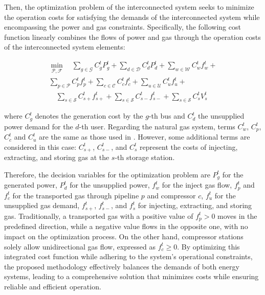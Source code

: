 Then, the optimization problem of the interconnected system seeks to minimize the operation costs for satisfying the demands of the interconnected system while encompassing the power and gas constraints. Specifically, the following cost function linearly combines the flows of power and gas through the operation costs of the interconnected system elements:

\begin{equation} \label{eq:obj_func_integrated}
\begin{split}
\min_{\mathcal{P}, \mathcal{F}} \quad  \sum_{g \in \mathcal{G}} C_{g}^t {P_{g}^t} + \sum_{d \in \mathcal{D}} C_{d}^t {P_{d}^t} +  \sum_{w \in \mathcal{W}} C_{w}^t {f_{w}^t} + \\ \sum_{p \in \mathcal{P}} C_{p}^t {f_{p}^t}  + \sum_{c \in \mathcal{C}} C_{c}^t {f_{c}^t} + \sum_{u \in \mathcal{U}} C_{u}^{t} {f_{u}^{t}} + \\ \quad \sum_{s \in \mathcal{S}} C_{s+}^{t} {f_{s+}^{t}}  + \sum_{s \in \mathcal{S}} C_{s-}^{t} {f_{s-}^{t}} + \sum_{s \in \mathcal{S}} C_{s}^{t} {V_{s}^{t}}
\end{split}
\end{equation}

where $C_g^t$ denotes the generation cost by the $g$-th bus and $C_d^t$ the unsupplied power demand for the $d$-th user. Regarding the natural gas system, terms $C_w^t$, $C_p^t$, $C_c^t$ and $C_u^t$ are the same as those used in . However, some additional terms are considered in this case: $C_{s+}^t$, $C_{s-}^t$, and $C_{s}^t$ represent the costs of injecting, extracting, and storing gas at the $s$-th storage station.





Therefore, the decision variables for the optimization problem are $P_g^t$ for the generated power, $P_d^t$ for the unsupplied power, $f_w^t$ for the inject gas flow, $f_p^t$ and $f_c^t$ for the transported gas through pipeline $p$ and compressor $c$, $f_u^t$ for the unsupplied gas demand, $f_{s+}^t$, $f_{s-}^t$, and $f_{s}^t$ for injecting, extracting, and storing gas. Traditionally, a transported gas with a positive value of $ f_ { p } ^t>0 $ moves in the predefined direction, while a negative value flows in the opposite one, with no impact on the optimization process. On the other hand, compressor stations solely allow unidirectional gas flow, expressed as $f_{c}^t\geq0$. By optimizing this integrated cost function while adhering to the system's operational constraints, the proposed methodology effectively balances the demands of both energy systems, leading to a comprehensive solution that minimizes costs while ensuring reliable and efficient operation.

